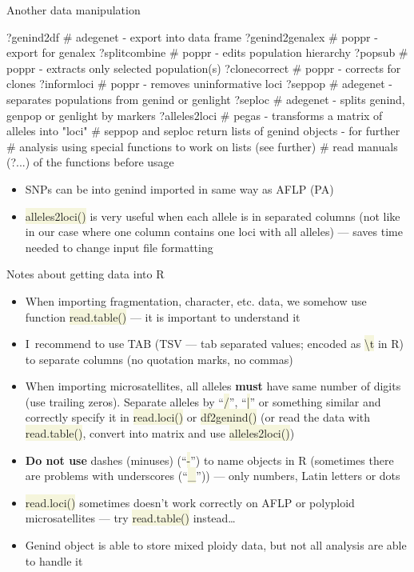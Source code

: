 \documentclass[compress, xelatex, 11pt, xcolor=svgnames, aspectratio=169,
	hyperref={
		bookmarks=true,
		unicode=true,
		colorlinks=true,
		pdftitle={Molecular data in R},
		plainpages=false,
		pdfauthor={Vojtech Zeisek},
		pdfsubject={Course about phylogeny and evolution in R},
		pdfcreator={XeLaTeX},
		pdfkeywords={R, evolution, phylogeny, molecular data},
		linkcolor=Crimson, %
		anchorcolor=Magenta, %
		citecolor=Magenta, %
		filecolor=Magenta, %
		menucolor=Magenta, %
		urlcolor=DodgerBlue, %
		},
	url={hyphens, lowtilde} %
	]{beamer}
\renewcommand{\texttt}[1]{\colorbox{Beige}{{\ttfamily #1}}}
\begin{document}
\begin{frame}[fragile]{Another data manipulation}
	\begin{spluscode}
    ?genind2df # adegenet - export into data frame
    ?genind2genalex # poppr - export for genalex
    ?splitcombine # poppr - edits population hierarchy
    ?popsub # poppr - extracts only selected population(s)
    ?clonecorrect # poppr - corrects for clones
    ?informloci # poppr - removes uninformative loci
    ?seppop # adegenet - separates populations from genind or genlight
    ?seploc # adegenet - splits genind, genpop or genlight by markers
    ?alleles2loci # pegas - transforms a matrix of alleles into "loci"
    # seppop and seploc return lists of genind objects - for further
    # analysis using special functions to work on lists (see further)
    # read manuals (?...) of the functions before usage
	\end{spluscode}
	\begin{itemize}
		\item SNPs can be into genind imported in same way as AFLP (PA)
		\item \texttt{alleles2loci()} is very useful when each allele is in separated columns (not like in our case where one column contains one loci with all alleles) --- saves time needed to change input file formatting
	\end{itemize}
\end{frame}

\begin{frame}{Notes about getting data into R}
	\begin{itemize}
		\item When importing fragmentation, character, etc. data, we somehow use function \texttt{read.table()} --- it is important to understand it
		\item I~recommend to use TAB (TSV --- tab separated values; encoded as \texttt{\textbackslash t} in R) to separate columns (no quotation marks, no commas)
		\item When importing microsatellites, all alleles \textbf{must} have same number of digits (use trailing zeros). Separate alleles by \enquote{\texttt{/}}, \enquote{\texttt{|}} or something similar and correctly specify it in \texttt{read.loci()} or \texttt{df2genind()} (or read the data with \texttt{read.table()}, convert into matrix and use \texttt{alleles2loci()})
		\item \textbf{Do not use} dashes (minuses) (\enquote{\texttt{-}}) to name objects in R (sometimes there are problems with underscores (\enquote{\texttt{\_}})) --- only numbers, Latin letters or dots
		\item \texttt{read.loci()} sometimes doesn't work correctly on AFLP or polyploid microsatellites --- try \texttt{read.table()} instead\ldots
		\item Genind object is able to store mixed ploidy data, but not all analysis are able to handle it
	\end{itemize}
\end{frame}
\end{document}
